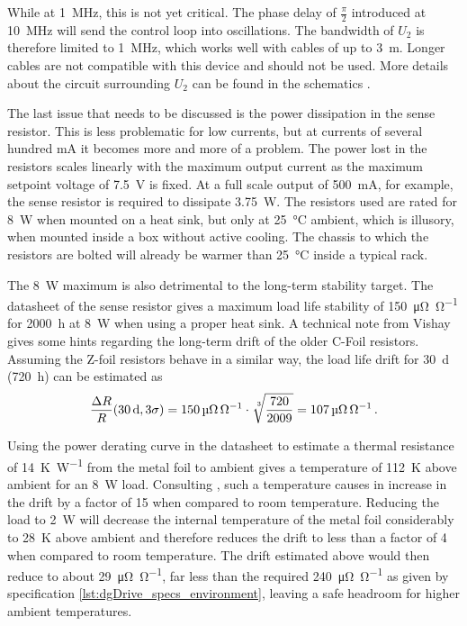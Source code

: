 While at \qty{1}{\MHz}, this is not yet critical. The phase delay of $\frac{\pi}{2}$ introduced at \qty{10}{\MHz} will send the control loop into oscillations. The bandwidth of $U_2$ is therefore limited to \qty{1}{\MHz}, which works well with cables of up to \qty{3}{\m}. Longer cables are not compatible with this device and should not be used. More details about the circuit surrounding $U_2$ can be found in the schematics \cite{git_dgDrive}.

The last issue that needs to be discussed is the power dissipation in the sense resistor. This is less problematic for low currents, but at currents of several hundred \unit{\mA} it becomes more and more of a problem. The power lost in the resistors scales linearly with the maximum output current as the maximum setpoint voltage of \qty{7.5}{\V} is fixed. At a full scale output of \qty{500}{\mA}, for example, the sense resistor is required to dissipate \qty{3.75}{\W}. The resistors used are rated for \qty{8}{\W} when mounted on a heat sink, but only at \qty{25}{\celsius} ambient, which is illusory, when mounted inside a box without active cooling. The chassis to which the resistors are bolted will already be warmer than \qty{25}{\celsius} inside a typical rack.

The \qty{8}{\W} maximum is also detrimental to the long-term stability target. The datasheet of the sense resistor gives a maximum load life stability of \qty{150}{\micro \ohm \per \ohm} for \qty{2000}{\hour} at \qty{8}{\W} \cite{datasheet_VPR}  when using a proper heat sink. A technical note from Vishay \cite{ResistorDrift} gives some hints regarding the long-term drift of the older C-Foil resistors. Assuming the Z-foil  resistors behave in a similar way, the load life drift for \qty{30}{\day} (\qty{720}{\hour}) can be estimated as
\begin{equation*}
    \frac{\Delta R}{R}(\qty{30}{\day}, 3\sigma) = \qty{150}{\micro \ohm \per \ohm} \cdot \sqrt[\leftroot{-2}\uproot{2}3]{\frac{720}{2009}} = \qty{107}{\micro \ohm \per \ohm}\,.
\end{equation*}

Using the power derating curve in the datasheet \cite{datasheet_VPR} to estimate a thermal resistance of \qty{14}{\K \per \W} from the metal foil to ambient gives a temperature of \qty{112}{\K} above ambient for an \qty{8}{\W} load. Consulting \cite{ResistorDrift}, such a temperature causes in increase in the drift by a factor of \num{15} when compared to room temperature. Reducing the load to \qty{2}{\W} will decrease the internal temperature of the metal foil considerably to \qty{28}{\K} above ambient and therefore reduces the drift to less than a factor of \num{4} when compared to room temperature. The drift estimated above would then reduce to about \qty{29}{\micro \ohm \per \ohm}, far less than the required \qty{240}{\micro \ohm \per \ohm} as given by specification \ref{lst:dgDrive_specs_environment}, leaving a safe headroom for higher ambient temperatures.

